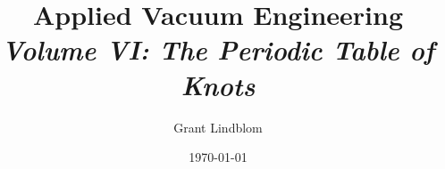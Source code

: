 \documentclass[11pt,letterpaper,twoside]{book}
\begin{document}
\frontmatter
\title{\textbf{Applied Vacuum Engineering} \\ \large \textit{Volume VI: The Periodic Table of Knots}}
\author{Grant Lindblom}
\date{\today}
\maketitle



\tableofcontents

\mainmatter

























\appendix




\backmatter


\end{document}
